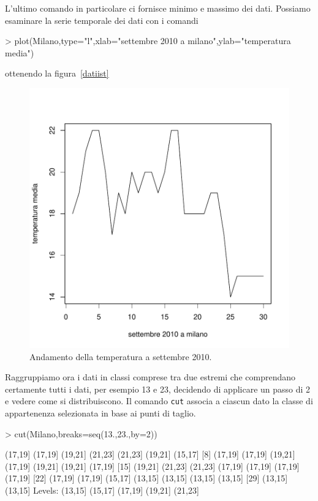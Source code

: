 \documentclass[onecolumn,11pt]{book}
\begin{document}
L'ultimo comando in particolare ci fornisce minimo e massimo dei dati.
Possiamo esaminare la serie temporale dei dati con i comandi
\begin{Schunk}
\begin{Sinput}
> plot(Milano,type="l",xlab="settembre 2010 a milano",ylab="temperatura media")
\end{Sinput}
\end{Schunk}
ottenendo la figura~\ref{datiist}
\begin{figure}[htbp]
\begin{center}
\includegraphics{statisticaconR-155}
\caption{ Andamento della temperatura a settembre 2010. }
\label{fig:datiist}
\end{center}
\end{figure}

Raggruppiamo ora i dati in classi comprese  tra due estremi che comprendano certamente tutti i dati, per esempio 13 e 23, decidendo di applicare un passo di 2 e vedere come si distribuiscono. Il comando \texttt{cut} associa a ciascun dato la classe di appartenenza selezionata in base ai punti di taglio.

\begin{Schunk}
\begin{Sinput}
> cut(Milano,breaks=seq(13.,23.,by=2))
\end{Sinput}
\begin{Soutput}
 [1] (17,19] (17,19] (19,21] (21,23] (21,23] (19,21] (15,17]
 [8] (17,19] (17,19] (19,21] (17,19] (19,21] (19,21] (17,19]
[15] (19,21] (21,23] (21,23] (17,19] (17,19] (17,19] (17,19]
[22] (17,19] (17,19] (15,17] (13,15] (13,15] (13,15] (13,15]
[29] (13,15] (13,15]
Levels: (13,15] (15,17] (17,19] (19,21] (21,23]
\end{Soutput}
\end{Schunk}
\end{document}
